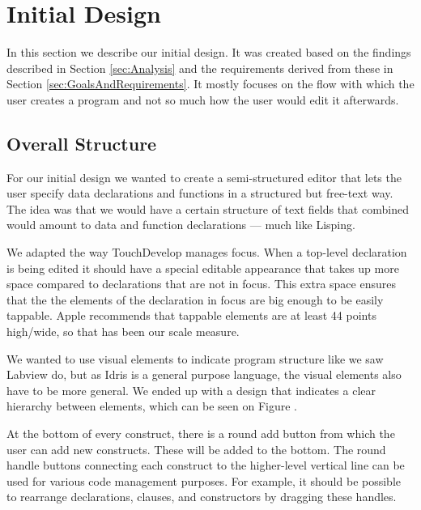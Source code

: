 \section{Initial Design}
\label{sec:InitialDesign}

In this section we describe our initial design. It was created based on the
findings described in Section \ref{sec:Analysis} and the requirements derived
from these in Section \ref{sec:GoalsAndRequirements}. It mostly focuses on the
flow with which the user creates a program and not so much how the user would
edit it afterwards.

\subsection{Overall Structure}
For our initial design we wanted to create a semi-structured editor that lets
the user specify data declarations and functions in a structured but free-text way. The idea was that we would have a certain structure of text fields that
combined would amount to data and function declarations --- much like Lisping.

We adapted the way TouchDevelop manages focus. When a top-level declaration is
being edited it should have a special editable appearance that takes up more
space compared to declarations that are not in focus. This extra space ensures
that the the elements of the declaration in focus are big enough to be easily
tappable. Apple recommends that tappable elements are at least 44 points high/wide, so that has been our scale measure.

We wanted to use visual elements to indicate program structure like we saw
Labview do, but as Idris is a general purpose language, the visual elements
also have to be more general. We ended up with a design that indicates a clear
hierarchy between elements, which can be seen on Figure .

\missingfigure{}

At the bottom of every construct, there is a round add button from which the user can add new constructs. These will be added to the bottom. The round handle buttons connecting each construct to the higher-level vertical line
can be used for various code management purposes. For example, it should be
possible to rearrange declarations, clauses, and constructors by dragging these
handles. 

